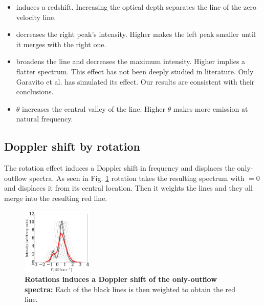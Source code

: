 \documentclass[twocolappendix]{latex/emulateapj}
\begin{document}
\begin{itemize}
	\item \tauh induces a redshift. Increasing the optical depth separates the line of the zero velocity line. \\
	\item \vout decreases the right peak's intensity. Higher \vout makes the left peak smaller until it merges with the right one. \\
	\item \vrot broadens the line and decreases the maximum intensity. Higher \vrot implies a flatter spectrum. This effect has not been deeply studied in literature. Only Garavito et al. \cite{Garavito14} has simulated its effect. Our results are consistent with their conclusions.
	\item $\theta$ increases the central valley of the line. Higher $\theta$ makes more emission at \lya natural frequency. \\ 
\end{itemize}

\subsection{Doppler shift by rotation}

The rotation effect induces a Doppler shift in frequency and displaces the only-outflow spectra. As seen in Fig. \ref{fig:rotation_doppler_outflow} rotation takes the resulting spectrum with \vrot$=0$ and displaces it from its central location. Then it weights the lines and they all merge into the resulting red \lya line.\\

\begin{figure}[h!]
	\begin{center}
		\includegraphics[width=0.3\textwidth]{./figures/rotation_doppler_outflow}
	\end{center}
	\caption{\textbf{Rotations induces a Doppler shift of the only-outflow spectra:} Each of the black lines is then weighted to obtain the red line.
		\label{fig:rotation_doppler_outflow}}
\end{figure}
\end{document}
